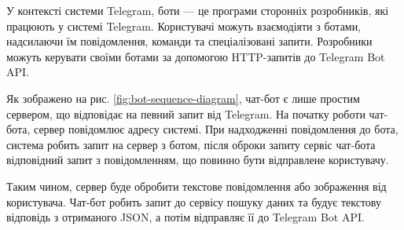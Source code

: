 У контексті системи Telegram, боти — це програми сторонніх розробників,
які працюють у системі Telegram.
Користувачі можуть взаємодіяти з ботами, надсилаючи їм повідомлення,
команди та спеціалізовані запити.
Розробники можуть керувати своїми ботами за допомогою HTTP-запитів до Telegram Bot API.

Як зображено на рис. \ref{fig:bot-sequence-diagram}, чат-бот є лише простим сервером, що відповідає на певний запит від Telegram.
На початку роботи чат-бота, сервер повідомлює адресу системі.
При надходженні повідомлення до бота, система робить запит на сервер з ботом,
після оброки запиту сервіс чат-бота відповідний запит з повідомленням, що повинно бути
відправлене користувачу.

Таким чином, сервер буде обробити текстове повідомлення або зображення від користувача.
Чат-бот робить запит до сервісу пошуку даних та будує текстову відповідь з отриманого JSON,
а потім відправляє її до Telegram Bot API.
